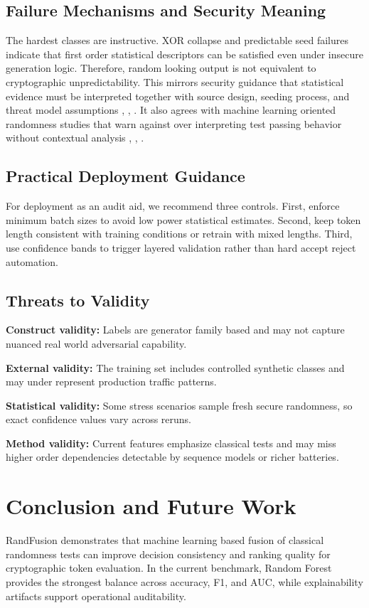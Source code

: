 \documentclass[conference]{IEEEtran}
\begin{document}
\subsection{Failure Mechanisms and Security Meaning}
The hardest classes are instructive. XOR collapse and predictable seed failures indicate that first order statistical descriptors can be satisfied even under insecure generation logic. Therefore, random looking output is not equivalent to cryptographic unpredictability. This mirrors security guidance that statistical evidence must be interpreted together with source design, seeding process, and threat model assumptions \cite{b2}, \cite{b7}, \cite{b9}. It also agrees with machine learning oriented randomness studies that warn against over interpreting test passing behavior without contextual analysis \cite{b5}, \cite{b6}, \cite{b11}.

\subsection{Practical Deployment Guidance}
For deployment as an audit aid, we recommend three controls. First, enforce minimum batch sizes to avoid low power statistical estimates. Second, keep token length consistent with training conditions or retrain with mixed lengths. Third, use confidence bands to trigger layered validation rather than hard accept reject automation.

\subsection{Threats to Validity}
\textbf{Construct validity:} Labels are generator family based and may not capture nuanced real world adversarial capability.

\textbf{External validity:} The training set includes controlled synthetic classes and may under represent production traffic patterns.

\textbf{Statistical validity:} Some stress scenarios sample fresh secure randomness, so exact confidence values vary across reruns.

\textbf{Method validity:} Current features emphasize classical tests and may miss higher order dependencies detectable by sequence models or richer batteries.

\section{Conclusion and Future Work}
RandFusion demonstrates that machine learning based fusion of classical randomness tests can improve decision consistency and ranking quality for cryptographic token evaluation. In the current benchmark, Random Forest provides the strongest balance across accuracy, F1, and AUC, while explainability artifacts support operational auditability.
\end{document}
